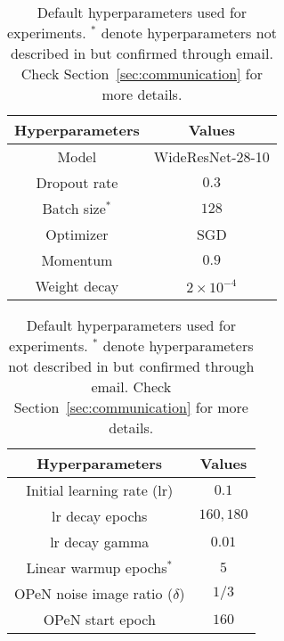 \begin{table}[!ht]
    \centering
    \begin{subtable}[b]{0.49\textwidth}
        \centering
        \begin{tabular}{c|c}
            Hyperparameters & Values \\
            \hline
            Model & WideResNet-28-10 \\
            Dropout rate & $0.3$ \\
            Batch size$^{*}$ & $128$ \\
            Optimizer & SGD \\
            Momentum & $0.9$ \\
            Weight decay & $2 \times 10^{-4}$ \\
        \end{tabular}
    \end{subtable}
    \hfill
    \begin{subtable}[b]{0.49\textwidth}
        \centering
        \begin{tabular}{c|c}
            Hyperparameters & Values \\
            \hline
            Initial learning rate (lr) & $0.1$ \\
            lr decay epochs & $160, 180$ \\
            lr decay gamma & $0.01$ \\
            Linear warmup epochs$^{*}$ & $5$ \\
            OPeN noise image ratio ($\delta$) & $1/3$ \\
            OPeN start epoch & $160$ \\
        \end{tabular}
    \end{subtable}
    \caption{Default hyperparameters used for experiments. $^{*}$ denote hyperparameters not described in \citet{PureNoise} but confirmed through email. Check Section~\ref{sec:communication} for more details.}
    \label{tab:hyperparameters}
\end{table}


